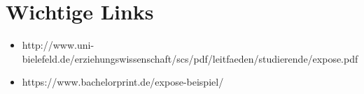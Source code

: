 \section*{Wichtige Links}
\begin{itemize}
\item http://www.uni-bielefeld.de/erziehungswissenschaft/scs/pdf/leitfaeden/studierende/expose.pdf
\item https://www.bachelorprint.de/expose-beispiel/
\end{itemize}